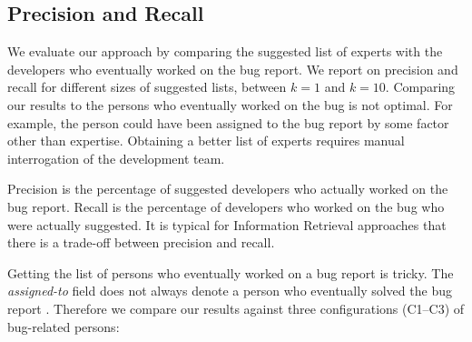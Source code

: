

\subsection{Precision and Recall}

We evaluate our approach by comparing the suggested list of experts with the developers who eventually worked on the bug report. We report on precision and recall for different sizes of suggested lists, between $k = 1$ and $k = 10$. Comparing our results to the persons who eventually worked on the bug is not optimal. For example, the person could have been assigned to the bug report by some factor other than expertise. Obtaining a better list of experts requires manual interrogation of the development team.

Precision is the percentage of suggested developers who actually worked on the bug report. Recall is the percentage of developers who worked on the bug who were actually suggested. It is typical for Information Retrieval approaches that there is a trade-off between precision and recall.

Getting the list of persons who eventually worked on a bug report is tricky. The \emph{assigned-to} field does not always denote a person who eventually solved the bug report \cite{Cubr04b, Anvi06a, Anvik07}. Therefore we compare our results against three configurations (C1--C3) of bug-related persons:

